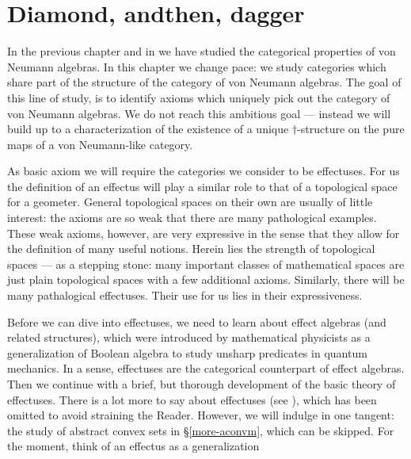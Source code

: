\documentclass[b]{subfiles}
\begin{document}
\chapter{Diamond, andthen, dagger}

\begin{parsec}%
\begin{point}%
In the previous chapter and in \cite{bram}
    we have studied the categorical properties of von Neumann algebras.
In this chapter we change pace:
    we study categories which share part of the structure
    of the category of von Neumann algebras.
The goal of this line of study, is to identify
    axioms which uniquely pick out the category of von Neumann algebras.
We do not reach this ambitious goal ---
    instead we will build up to a characterization of
    the existence of a unique $\dagger$-structure
    on the pure maps of a von Neumann-like category.
\end{point}
\begin{point}%
As basic axiom we will require the categories we consider to be
    effectuses.
For us the definition of an effectus will play a similar role
    to that of a topological space for a geometer.
General topological spaces on their own are usually of little interest:
    the axioms are so weak that there are many pathological examples.
    These weak axioms, however, are very expressive in the sense
    that they allow for the definition of many useful notions.
    Herein lies the strength of topological spaces ---
    as a stepping stone:
    many important classes of mathematical spaces
    are just plain topological spaces with a few additional axioms.
Similarly, there will be many pathalogical effectuses.
Their use for us lies in their expressiveness.
\end{point}
\begin{point}%
Before we can dive into effectuses,
    we need to learn about effect algebras (and related structures),
    which were introduced by mathematical physicists as
    a generalization of Boolean algebra to study unsharp predicates
    in quantum mechanics.
    In a sense, effectuses are the categorical counterpart of effect algebras.
Then we continue with a brief, but thorough development
    of the basic theory of effectuses.
There is a lot more to say about effectuses
    (see \cite{effintro}), which has been omitted
    to avoid straining the Reader.
    However, we will indulge in one tangent:
    the study of abstract convex sets in
    \S\ref{more-aconvm}, which can be skipped.
For the moment, think of an effectus as a generalization

\end{point}
\end{parsec}
\end{document}
